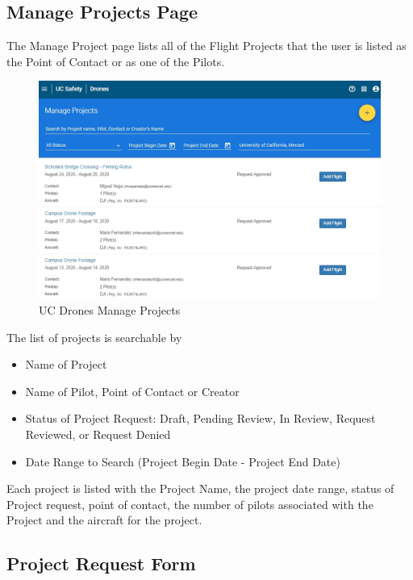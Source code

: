 \documentclass[
  12pt,
]{book}
\providecommand{\tightlist}{%
  \setlength{\itemsep}{0pt}\setlength{\parskip}{0pt}}
\begin{document}
\hypertarget{manage-projects-page}{%
\subsection{Manage Projects Page}\label{manage-projects-page}}

The Manage Project page lists all of the Flight Projects that the user is listed as the Point of Contact or as one of the Pilots.

\begin{figure}

{\centering \includegraphics[width=0.85\linewidth]{images/UCDrones_manage_project} 

}

\caption{UC Drones Manage Projects}\label{fig:UCDrones-project}
\end{figure}

The list of projects is searchable by

\begin{itemize}
\tightlist
\item
  Name of Project
\item
  Name of Pilot, Point of Contact or Creator
\item
  Status of Project Request: Draft, Pending Review, In Review, Request Reviewed, or Request Denied
\item
  Date Range to Search (Project Begin Date - Project End Date)
\end{itemize}

Each project is listed with the Project Name, the project date range, status of Project request, point of contact, the number of pilots associated with the Project and the aircraft for the project.

\hypertarget{project-request-form}{%
\subsection{Project Request Form}\label{project-request-form}}
\end{document}
